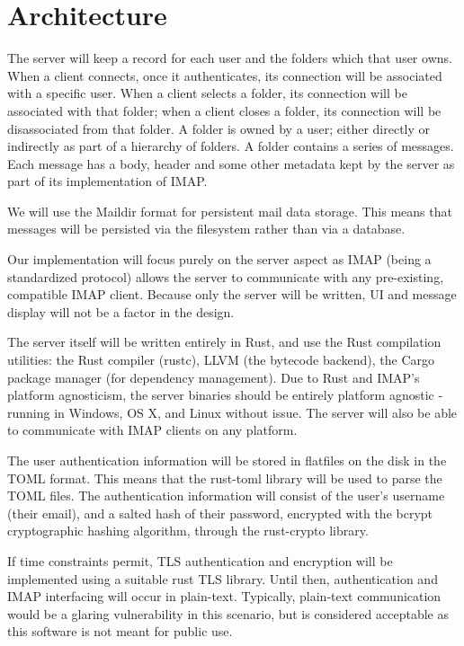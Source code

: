 \documentclass[a4paper,12pt]{article}
\begin{document}
\section*{Architecture}

The server will keep a record for each user and the folders which that user owns. When a client connects, once it authenticates, its connection will be associated with a specific user. When a client selects a folder, its connection will be associated with that folder; when a client closes a folder, its connection will be disassociated from that folder. A folder is owned by a user; either directly or indirectly as part of a hierarchy of folders. A folder contains a series of messages. Each message has a body, header and some other metadata kept by the server as part of its implementation of IMAP.

We will use the Maildir format for persistent mail data storage. This means that messages will be persisted via the filesystem rather than via a database.

Our implementation will focus purely on the server aspect as IMAP (being a standardized protocol) allows the server to communicate with any pre-existing, compatible IMAP client. Because only the server will be written, UI and message display will not be a factor in the design.

The server itself will be written entirely in Rust, and use the Rust compilation utilities: the Rust compiler (rustc), LLVM (the bytecode backend), the Cargo package manager (for dependency management). Due to Rust and IMAP's platform agnosticism, the server binaries should be entirely platform agnostic - running in Windows, OS X, and Linux without issue. The server will also be able to communicate with IMAP clients on any platform.

The user authentication information will be stored in flatfiles on the disk in the TOML format. This means that the rust-toml library will be used to parse the TOML files. The authentication information will consist of the user's username (their email), and a salted hash of their password, encrypted with the bcrypt cryptographic hashing algorithm, through the rust-crypto library.

If time constraints permit, TLS authentication and encryption will be implemented using a suitable rust TLS library. Until then, authentication and IMAP interfacing will occur in plain-text. Typically, plain-text communication would be a glaring vulnerability in this scenario, but is considered acceptable as this software is not meant for public use.
\end{document}
